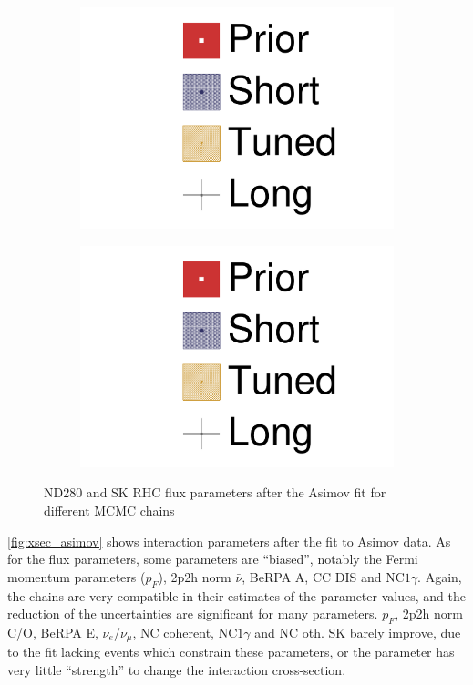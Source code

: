 \begin{figure}[h]
\begin{subfigure}[t]{0.24\textwidth}
		\includegraphics[width=\textwidth, trim={0mm 0mm 0mm 0mm}, clip,page=16]{figures/mach3/Asimov/2017_NewDet_Asimov_actually_0_2017b_NewDet_3Xsec_4Det_5Flux_NewXSecTune_Asimov_0_2017b_NewDet_NewData_Asimov_Long_0}
	\end{subfigure}
	\begin{subfigure}[t]{0.24\textwidth}
		\includegraphics[width=\textwidth, trim={0mm 0mm 0mm 0mm}, clip,page=17]{figures/mach3/Asimov/2017_NewDet_Asimov_actually_0_2017b_NewDet_3Xsec_4Det_5Flux_NewXSecTune_Asimov_0_2017b_NewDet_NewData_Asimov_Long_0}
	\end{subfigure}
	\caption{ND280 and SK RHC flux parameters after the Asimov fit for different MCMC chains}
	\label{fig:flux_asimov_rhc}
\end{figure}
\autoref{fig:xsec_asimov} shows interaction parameters after the fit to Asimov data. As for the flux parameters, some parameters are ``biased'', notably the Fermi momentum parameters ($p_F$), 2p2h norm $\bar{\nu}$, BeRPA A, CC DIS and NC$1\gamma$. Again, the chains are very compatible in their estimates of the parameter values, and the reduction of the uncertainties are significant for many parameters. $p_F$, 2p2h norm C/O, BeRPA E, $\nu_e$/$\nu_\mu$, NC coherent, NC$1\gamma$ and NC oth. SK barely improve, due to the fit lacking events which constrain these parameters, or the parameter has very little ``strength'' to change the interaction cross-section.


